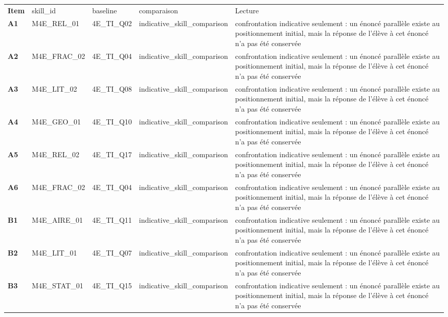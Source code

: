 \documentclass[10pt,a4paper]{article}
\begin{document}
\par\noindent\begin{tabularx}{\linewidth}{>{\bfseries}p{9mm} >{\ttfamily\scriptsize}p{25mm} >{\ttfamily\scriptsize}p{22mm} >{\ttfamily\scriptsize}p{16mm} X}
\rowcolor{Navy}\color{white}Item & \color{white}\scriptsize skill\_id & \color{white}\scriptsize baseline & \color{white}\scriptsize comparaison & \color{white}Lecture \\
A1 & M4E\_REL\_01 & 4E\_TI\_Q02 & indicative\_skill\_comparison & confrontation indicative seulement : un énoncé parallèle existe au positionnement initial, mais la réponse de l'élève à cet énoncé n'a pas été conservée \\
A2 & M4E\_FRAC\_02 & 4E\_TI\_Q04 & indicative\_skill\_comparison & confrontation indicative seulement : un énoncé parallèle existe au positionnement initial, mais la réponse de l'élève à cet énoncé n'a pas été conservée \\
A3 & M4E\_LIT\_02 & 4E\_TI\_Q08 & indicative\_skill\_comparison & confrontation indicative seulement : un énoncé parallèle existe au positionnement initial, mais la réponse de l'élève à cet énoncé n'a pas été conservée \\
A4 & M4E\_GEO\_01 & 4E\_TI\_Q10 & indicative\_skill\_comparison & confrontation indicative seulement : un énoncé parallèle existe au positionnement initial, mais la réponse de l'élève à cet énoncé n'a pas été conservée \\
A5 & M4E\_REL\_02 & 4E\_TI\_Q17 & indicative\_skill\_comparison & confrontation indicative seulement : un énoncé parallèle existe au positionnement initial, mais la réponse de l'élève à cet énoncé n'a pas été conservée \\
A6 & M4E\_FRAC\_02 & 4E\_TI\_Q04 & indicative\_skill\_comparison & confrontation indicative seulement : un énoncé parallèle existe au positionnement initial, mais la réponse de l'élève à cet énoncé n'a pas été conservée \\
B1 & M4E\_AIRE\_01 & 4E\_TI\_Q11 & indicative\_skill\_comparison & confrontation indicative seulement : un énoncé parallèle existe au positionnement initial, mais la réponse de l'élève à cet énoncé n'a pas été conservée \\
B2 & M4E\_LIT\_01 & 4E\_TI\_Q07 & indicative\_skill\_comparison & confrontation indicative seulement : un énoncé parallèle existe au positionnement initial, mais la réponse de l'élève à cet énoncé n'a pas été conservée \\
B3 & M4E\_STAT\_01 & 4E\_TI\_Q15 & indicative\_skill\_comparison & confrontation indicative seulement : un énoncé parallèle existe au positionnement initial, mais la réponse de l'élève à cet énoncé n'a pas été conservée \\

\end{tabularx}
\end{document}

